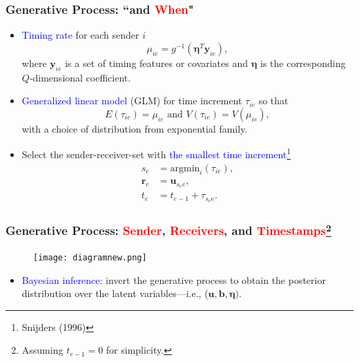 \documentclass{beamer}
\begin{document}
\begin{frame}
	\frametitle{Generative Process: ``and \textcolor{red}{When}"}
		\begin{itemize}
			\item \textcolor{blue}{Timing rate} for each sender $i$
			\begin{equation*}
			\mu_{ie} = g^{-1}(\boldsymbol{\eta}^T \boldsymbol{y}_{ie}),
			\end{equation*}
				where $\boldsymbol{y}_{ie}$ is a set of timing features or covariates and $\boldsymbol{\eta}$ is the corresponding $Q$-dimensional coefficient. \vspace{0.15cm}
			\item \textcolor{blue}{Generalized linear model} (GLM) for time increment $\tau_{ie}$ so that
			\begin{equation*}
			E(\tau_{ie}) = 	\mu_{ie} \mbox{ and } V(\tau_{ie}) = V(	\mu_{ie}),
			\end{equation*}
			with a choice of distribution from exponential family.\vspace{0.15cm}
			\item Select the sender-receiver-set with \textcolor{blue}{the smallest time increment}\footnote{\scriptsize Snijders (1996)}
						\begin{equation*}
						\begin{aligned}
						s_e &= \mbox{argmin}_{i}(\tau_{ie}),\\
						\boldsymbol{r}_e &= \boldsymbol{u}_{s_e e},\\
						t_e &=t_{e-1} + \tau_{s_e e}.
						\end{aligned}
						\end{equation*}
		\end{itemize}
	\end{frame}
	\begin{frame}
		\frametitle{Generative Process: \textcolor{red}{Sender}, \textcolor{red}{Receivers}, and \textcolor{red}{Timestamps}\footnote{\scriptsize Assuming $t_{e-1}=0$ for simplicity.}}
					\begin{figure}[H]
						\centering
						\texttt{[image: diagramnew.png]}	
						\label{figure:diagram}
					\end{figure}
				\normalsize
					\begin{itemize}
						\item \textcolor{blue}{Bayesian inference}: invert the generative process to obtain the posterior
distribution over the latent variables---i.e., ($\boldsymbol{u},\boldsymbol{b},\boldsymbol{\eta})$.
					\end{itemize}						
			\end{frame}
			
\end{document}
